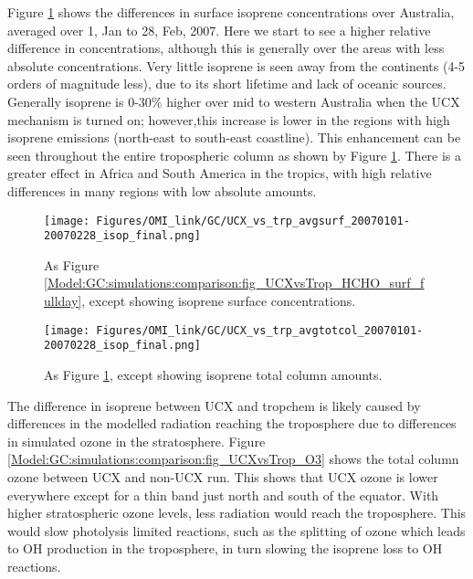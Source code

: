       Figure \ref{Model:GC:simulations:comparison:fig_UCXvsTrop_isop_surf_fullday} shows the differences in surface isoprene concentrations over Australia, averaged over 1, Jan to 28, Feb, 2007.
      Here we start to see a higher relative difference in concentrations, although this is generally over the areas with less absolute concentrations. 
      Very little isoprene is seen away from the continents (4-5 orders of magnitude less), due to its short lifetime and  lack of oceanic sources.
      Generally isoprene is 0-30\% higher over mid to western Australia when the UCX mechanism is turned on; however,this increase is lower in the regions with high isoprene emissions (north-east to south-east coastline).
      This enhancement can be seen throughout the entire tropospheric column as shown by Figure \ref{Model:GC:simulations:comparison:fig_UCXvsTrop_isop_surf_fullday}.
      There is a greater effect in Africa and South America in the tropics, with high relative differences in many regions with low absolute amounts.
      
      \begin{figure}
        \texttt{[image: Figures/OMI\_link/GC/UCX\_vs\_trp\_avgsurf\_20070101-20070228\_isop\_final.png]}
        \caption{ %
          As Figure \ref{Model:GC:simulations:comparison:fig_UCXvsTrop_HCHO_surf_fullday}, except showing isoprene surface concentrations. 
        }      
        \label{Model:GC:simulations:comparison:fig_UCXvsTrop_isop_surf_fullday}
      \end{figure}
      \begin{figure}
        \texttt{[image: Figures/OMI\_link/GC/UCX\_vs\_trp\_avgtotcol\_20070101-20070228\_isop\_final.png]}
        \caption{ %
          As Figure \ref{Model:GC:simulations:comparison:fig_UCXvsTrop_isop_surf_fullday}, except showing isoprene total column amounts. 
        }      
        \label{Model:GC:simulations:comparison:fig_UCXvsTrop_isop_totcol_fullday}
      \end{figure}
      
      
      The difference in isoprene between UCX and tropchem is likely caused by differences in the modelled radiation reaching the troposphere due to differences in simulated ozone in the stratosphere.
      Figure \ref{Model:GC:simulations:comparison:fig_UCXvsTrop_O3} shows the total column ozone between UCX and non-UCX run.
      This shows that UCX ozone is lower everywhere except for a thin band just north and south of the equator.
      With higher stratospheric ozone levels, less radiation would reach the troposphere.
      This would slow photolysis limited reactions, such as the splitting of ozone which leads to OH production in the troposphere, in turn slowing the isoprene loss to OH reactions.
      
